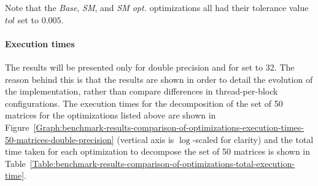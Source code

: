 Note that the \textit{Base}, \textit{SM}, and \textit{SM opt.} optimizations all had their tolerance value $ tol $ set to $ 0.005 $.

\paragraph{Execution times} The results will be presented only for double precision and for  set to 32. The reason behind this is that the results are shown in order to detail the evolution of the implementation, rather than compare differences in thread-per-block configurations. The execution times for the decomposition of the set of 50 matrices for the optimizations listed above are shown in Figure~\ref{Graph:benchmark-results-comparison-of-optimizations-execution-times-50-matrices-double-precision} (vertical axis is $ \log $-scaled for clarity) and the total time taken for each optimization to decompose the set of 50 matrices is shown in Table~\ref{Table:benchmark-results-comparison-of-optimizations-total-execution-time}.

